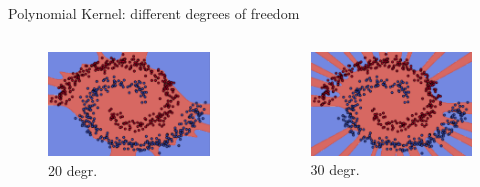 \documentclass[9.5pt]{beamer}
\begin{document}
\begin{frame}[fragile]{Polynomial Kernel: different degrees of freedom}
\begin{columns}[onlytextwidth]
\begin{figure}
                \includegraphics[width=\linewidth]{images/20}
                \caption{20 degr.}
            \end{figure}
            \centering
            \begin{figure}
                \centering
                \includegraphics[width=\linewidth]{images/30}
                \caption{30 degr.}
            \end{figure}
        \end{columns}
    \end{frame}
\end{document}
